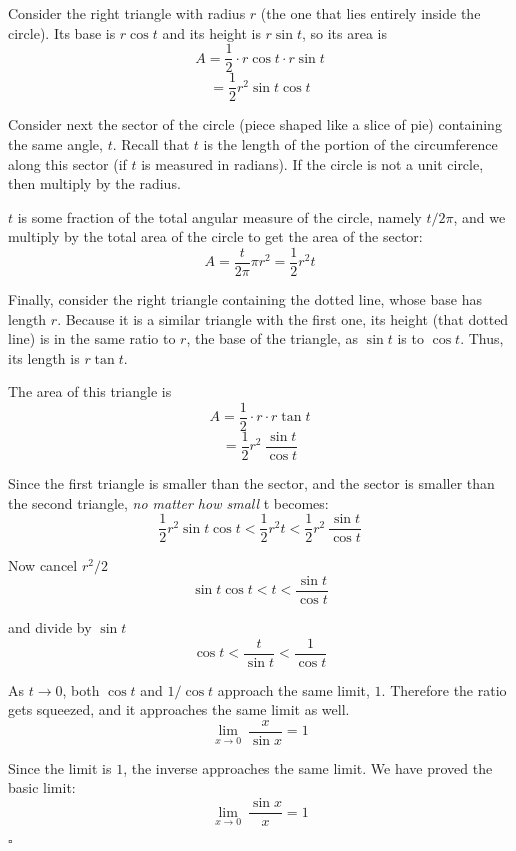 \documentclass[11pt, oneside]{article}
\begin{document}
Consider the right triangle with radius $r$ (the one that lies entirely inside the circle).  Its base is $r \cos t$ and its height is $r \sin t$, so its area is
\[    A = \frac{1}{2} \cdot r \cos t \cdot r \sin t   \]
\[    = \frac{1}{2} r^2 \sin t \cos t  \]

Consider next the sector of the circle (piece shaped like a slice of pie) containing the same angle, $t$.  Recall that $t$ is the length of the portion of the circumference along this sector (if $t$ is measured in radians).  If the circle is not a unit circle, then multiply by the radius.

$t$ is some fraction of the total angular measure of the circle, namely $t/2 \pi$, and we multiply by the total area of the circle to get the area of the sector:
\[    A = \frac{t}{2 \pi} \pi r^2 = \frac{1}{2} r^2 t  \]

Finally, consider the right triangle containing the dotted line, whose base has length $r$.  Because it is a similar triangle with the first one, its height (that dotted line) is in the same ratio to $r$, the base of the triangle, as $\sin t$ is to $\cos t$.  Thus, its length is $r \tan t$.

The area of this triangle is
\[   A = \frac{1}{2} \cdot r \cdot r \tan t   \]
\[    =  \frac{1}{2} r^2 \ \frac{\sin t}{\cos t}  \]

Since the first triangle is smaller than the sector, and the sector is smaller than the second triangle, \emph{no matter how small} t becomes:
\[    \frac{1}{2} r^2 \sin t \cos t < \frac{1}{2} r^2 t < \frac{1}{2} r^2 \ \frac{\sin t}{\cos t}  \]

Now cancel $r^2/2$
\[    \sin t \cos t < t < \frac{\sin t}{\cos t}  \]

and divide by $\sin t$
\[    \cos t < \frac{t}{\sin t} < \frac{1}{\cos t}  \]

As $t \rightarrow 0$, both $\cos t$ and $1/\cos t$ approach the same limit, $1$.  Therefore the ratio gets squeezed, and it approaches the same limit as well.  
\[    \lim_{x \rightarrow 0} \ \frac{x}{\sin x} = 1  \] 

Since the limit is $1$, the inverse approaches the same limit.  We have proved the basic limit:
\[  \lim_{x \rightarrow 0} \ \frac{\sin x}{x} = 1  \] 

$\square$
\end{document}

